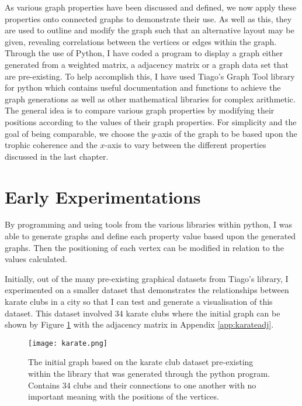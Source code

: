 As various graph properties have been discussed and defined, we now apply these properties onto connected graphs to demonstrate their use. As well as this, they are used to outline and modify the graph such that an alternative layout may be given, revealing correlations between the vertices or edges within the graph. Through the use of Python, I have coded a program to display a graph either generated from a weighted matrix, a adjacency matrix or a graph data set that are pre-existing. To help accomplish this, I have used Tiago's Graph Tool library for python which contains useful documentation and functions to achieve the graph generations as well as other mathematical libraries for complex arithmetic. The general idea is to compare various graph properties by modifying their positions according to the values of their graph properties. For simplicity and the goal of being comparable, we choose the $y$-axis of the graph to be based upon the trophic coherence and the $x$-axis to vary between the different properties discussed in the last chapter.

\section{Early Experimentations}
By programming and using tools from the various libraries within python, I was able to generate graphs and define each property value based upon the generated graphs. Then the positioning of each vertex can be modified in relation to the values calculated.

Initially, out of the many pre-existing graphical datasets from Tiago's library, I experimented on a smaller dataset that demonstrates the relationships between karate clubs in a city so that I can test and generate a visualisation of this dataset. This dataset involved 34 karate clubs where the initial graph can be shown by Figure \ref{fig:karate} with the adjacency matrix in Appendix \ref{app:karateadj}.

\begin{figure}[H]
	\centering
	\texttt{[image: karate.png]}
	\caption{The initial graph based on the karate club dataset pre-existing within the library that was generated through the python program. Contains 34 clubs and their connections to one another with no important meaning with the positions of the vertices.}
	\label{fig:karate}
\end{figure}


